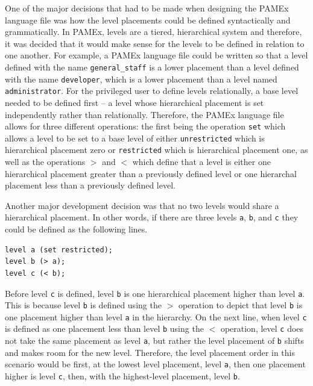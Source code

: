 One of the major decisions that had to be made when designing the PAMEx language file was how the 
level placements could be defined syntactically and grammatically. In 
PAMEx, levels are a tiered, hierarchical system and therefore, it was decided that it would make sense for the levels to be defined 
in relation to one another. For example, a PAMEx language file could be written so that a level defined with the name 
\texttt{general\_staff} is a lower placement than a level defined with the name 
\texttt{developer}, which is a lower placement than a level named \texttt{administrator}. 
For the privileged user to define levels relationally, a base level needed to be defined first – a level whose hierarchical placement is set independently 
rather than relationally. Therefore, the PAMEx language file allows for three different operations: the first being the 
operation \texttt{set} which allows a level to be set to a base level of either 
\texttt{unrestricted} which is hierarchical placement zero or \texttt{restricted} which is 
hierarchical placement one, as well as the operations \texttt{$>$} and \texttt{$<$} which 
define that a level is either one hierarchical placement greater than 
a previously defined level or one hierarchal placement less than a 
previously defined level.  

Another major development decision was that no two levels would share a 
hierarchical placement. In other words, if there are three levels \texttt{a}, 
\texttt{b}, and \texttt{c} they could be defined as the following lines. 

\begin{verbatim}
level a (set restricted); 
level b (> a); 
level c (< b); 
\end{verbatim}


Before level \texttt{c} is defined, level \texttt{b} is one hierarchical placement higher 
than level \texttt{a}. This is because level \texttt{b} is defined using the $>$ 
operation to depict that level \texttt{b} is one placement higher than level \texttt{a} 
in the hierarchy. On the next line, when level \texttt{c} is defined as one 
placement less than level \texttt{b} using the $<$ operation, level \texttt{c} does not take the same placement as 
level \texttt{a}, but rather the level placement of \texttt{b} shifts and makes room for 
the new level. Therefore, the level placement order in this scenario 
would be first, at the lowest level placement, level \texttt{a}, then one 
placement higher is level \texttt{c}, then, with the highest-level placement, 
level \texttt{b}. 

